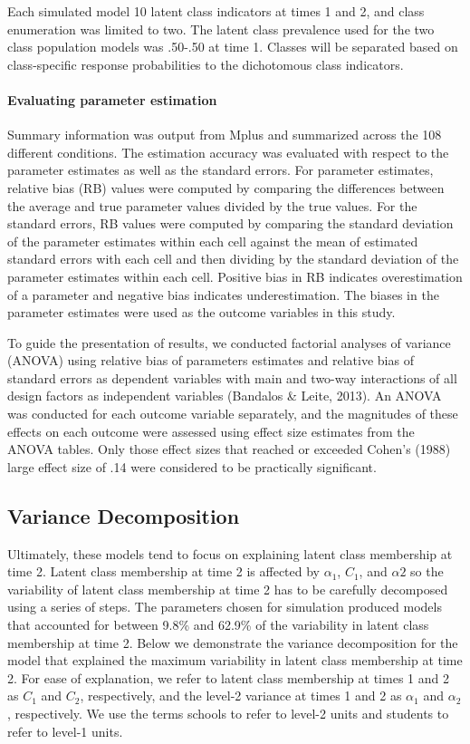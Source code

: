 \documentclass[man, noextraspace, floatsintext, 12pt]{apa7}
\begin{document}
Each simulated model 10 latent class indicators at times 1 and 2, and class enumeration was limited to two. The latent class prevalence used for the two class population models was .50-.50 at time 1. Classes will be separated based on class-specific response probabilities to the dichotomous class indicators. 


\paragraph*{Evaluating parameter estimation}
Summary information was output from Mplus and summarized across the 108 different conditions. The estimation accuracy was evaluated with respect to the parameter estimates as well as the standard errors. For parameter estimates, relative bias (RB) values were computed by comparing the differences between the average and true parameter values divided by the true values. For the standard errors, RB values were computed by comparing the standard deviation of the parameter estimates within each cell against the mean of estimated standard errors with each cell and then dividing by the standard deviation of the parameter estimates within each cell. Positive bias in RB indicates overestimation of a parameter and negative bias indicates underestimation. The biases in the parameter estimates were used as the outcome variables in this study.  

To guide the presentation of results, we conducted factorial analyses of variance (ANOVA) using relative bias of parameters estimates and relative bias of standard errors as dependent variables with main and two-way interactions of all design factors as independent variables (Bandalos \& Leite, 2013). An ANOVA was conducted for each outcome variable separately, and the magnitudes of these effects on each outcome were assessed using effect size estimates from the ANOVA tables.  Only those effect sizes that reached or exceeded Cohen's (1988) large effect size of .14 were considered to be practically significant.


\subsection*{Variance Decomposition}
Ultimately, these models tend to focus on explaining latent class membership at time 2. Latent class membership at time 2 is affected by $\alpha_1$, $C_1$, and $\alpha2$ so the variability of latent class membership at time 2 has to be carefully decomposed using a series of steps. The parameters chosen for simulation produced models that accounted for between 9.8\% and 62.9\% of the variability in latent class membership at time 2. Below we demonstrate the variance decomposition for the model that explained the maximum variability in latent class membership at time 2. For ease of explanation, we refer to latent class membership at times 1 and 2 as $C_1$ and $C_2$, respectively, and  the level-2 variance at times 1 and 2 as $\alpha_1$ and $\alpha_2$, respectively. We use the terms schools to refer to level-2 units and students to refer to level-1 units.
\end{document}
